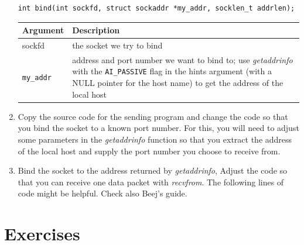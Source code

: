 \documentclass[12pt]{book}
\begin{document}
\begin{enumerate}[resume*]
\begin{lstlisting}
int bind(int sockfd, struct sockaddr *my_addr, socklen_t addrlen);    
  \end{lstlisting}

  \begin{tabular}{l p{10cm}}
    \toprule
    Argument & Description \\ \midrule
    sockfd & the socket we try to bind \\
    \verb$my_addr$ & address and port number we want to bind to; use \emph{getaddrinfo} with the \verb$AI_PASSIVE$ flag in the hints argument (with a NULL pointer for the host name) to get the address of the local host \\
    \bottomrule
  \end{tabular}

\item Copy the source code for the sending program and change the code so that you bind the socket to a known port number. For this, you will need to adjust some parameters in the \emph{getaddrinfo} function so that you extract the address of the local host and supply the port number you choose to receive from.

\item Bind the socket to the address returned by \emph{getaddrinfo}, Adjust the code so that you can receive one data packet with \emph{recvfrom}. The following lines of code might be helpful. Check also Beej's guide.

  

\end{enumerate}

  

\section{Exercises}
\end{document}
